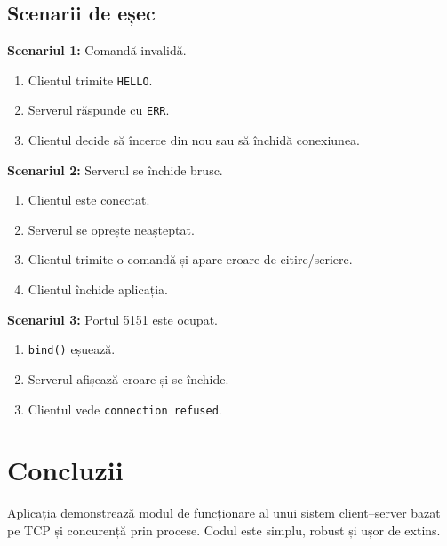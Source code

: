 \documentclass[runningheads]{llncs}
\begin{document}
\vspace{15mm}

\subsection{Scenarii de eșec}

\textbf{Scenariul 1:} Comandă invalidă.
\begin{enumerate}[noitemsep, topsep=0pt]
    \item Clientul trimite \texttt{HELLO}.
    \item Serverul răspunde cu \texttt{ERR}.
    \item Clientul decide să încerce din nou sau să închidă conexiunea.
\end{enumerate}

\vspace{5mm}

\textbf{Scenariul 2:} Serverul se închide brusc.
\begin{enumerate}[noitemsep, topsep=0pt]
    \item Clientul este conectat.
    \item Serverul se oprește neașteptat.
    \item Clientul trimite o comandă și apare eroare de citire/scriere.
    \item Clientul închide aplicația.
\end{enumerate}

\vspace{5mm}

\textbf{Scenariul 3:} Portul 5151 este ocupat.
\begin{enumerate}[noitemsep, topsep=0pt]
    \item \texttt{bind()} eșuează.
    \item Serverul afișează eroare și se închide.
    \item Clientul vede \texttt{connection refused}.
\end{enumerate}

\vspace{10mm}

\section{Concluzii}

Aplicația demonstrează modul de funcționare al unui sistem client--server bazat pe TCP și concurență prin procese. Codul este simplu, robust și ușor de extins.

\vspace{3mm}
\end{document}
